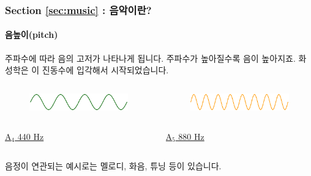 \documentclass{beamer}
\begin{document}
	\begin{frame}
		\frametitle{Section \ref{sec:music} : 음악이란?}
		\framesubtitle{음높이(pitch)}
		주파수에 따라 음의 고저가 나타나게 됩니다. 주파수가 높아질수록 음이 높아지죠. 화성학은 이 진동수에 입각해서 시작되었습니다.
		\begin{columns}
			\begin{column}{0.5\textwidth}
				\centering
				\noindent
				\begin{figure}[h!]
					\includegraphics[width=0.9\columnwidth]{res/pdf/2/pitch/A4.eps}
				\end{figure}
				\noindent
			\end{column}
			\begin{column}{0.5\textwidth}
				\centering
				\begin{figure}[h!]
					\includegraphics[width=0.9\columnwidth]{res/pdf/2/pitch/A5.eps}
				\end{figure}
			\end{column}
		\end{columns}
		\begin{columns}
			\begin{column}{0.5\textwidth}
				\centering
				\color{cyan} \href{run:res/mp3/2/pitch/A4.mp3}{A$_4$ 440 Hz}
			\end{column}
			\begin{column}{0.5\textwidth}
				\centering
				\color{cyan} \href{run:res/mp3/2/pitch/A5.mp3}{A$_5$ 880 Hz}
			\end{column}
		\end{columns}
		음정이 연관되는 예시로는 멜로디, 화음, 튜닝 등이 있습니다.
	\end{frame}
	
\end{document}
